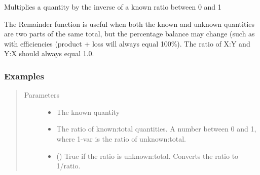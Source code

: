 \documentclass[a4paper,10pt,english]{sphinxmanual}
\begin{document}

\begin{fulllineitems}
\label{\detokenize{calculators:calculators.Remainder}}
Multiplies a quantity by the inverse of a known ratio between 0 and 1

The Remainder function is useful when both the known and unknown quantities
are two parts of the same total, but the percentage balance may change
(such as with efficiencies (product + loss will always equal 100\%).
The ratio of X:Y and Y:X should always equal 1.0.
\subsubsection*{Examples}

\begin{sphinxVerbatim}[commandchars=\\\{\}]
 
\end{sphinxVerbatim}

\begin{sphinxVerbatim}[commandchars=\\\{\}]
  
\end{sphinxVerbatim}
\begin{quote}\begin{description}
\item[{Parameters}] \leavevmode\begin{itemize}
\item {} 
 \textendash{} The known quantity

\item {} 
 \textendash{} The ratio of known:total quantities. A number between 0 and 1,
where 1-var is the ratio of unknown:total.

\item {} 
 () \textendash{} True if the ratio is unknown:total. Converts the ratio
to 1/ratio.

\end{itemize}

\end{description}\end{quote}

\end{fulllineitems}
\end{document}
